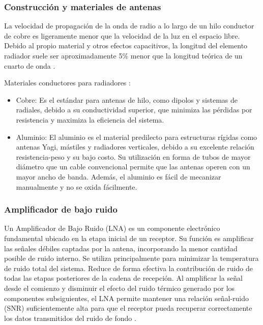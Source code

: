 \documentclass[12pt,a4paper]{article}
\begin{document}
\subsubsection{Construcción y materiales de antenas}\label{construcciuxf3n-y-materiales-antenas}

La velocidad de propagación de la onda de radio a lo largo de un hilo conductor de cobre es ligeramente menor que la velocidad de la luz en el espacio libre. Debido al propio material y otros efectos capacitivos, la longitud del elemento radiador suele ser aproximadamente 5\% menor que la longitud teórica de un cuarto de onda \cite{ref70}.

Materiales conductores para radiadores \cite{ref70}:

\begin{itemize}
\item
  Cobre: Es el estándar para antenas de hilo, como dipolos y sistemas de radiales, debido a su conductividad superior, que minimiza las pérdidas por resistencia y maximiza la eficiencia del sistema.
\item
  Aluminio: El aluminio es el material predilecto para estructuras rígidas como antenas Yagi, mástiles y radiadores verticales, debido a su excelente relación resistencia-peso y su bajo costo. Su utilización en forma de tubos de mayor diámetro que un cable convencional permite que las antenas operen con un mayor ancho de banda. Además, el aluminio es fácil de mecanizar manualmente y no se oxida fácilmente.
\end{itemize}

\subsubsection{Amplificador de bajo ruido}\label{amplificador-de-bajo-ruido}

Un Amplificador de Bajo Ruido (LNA) es un componente electrónico fundamental ubicado en la etapa inicial de un receptor. Su función es amplificar las señales débiles captadas por la antena, incorporando la menor cantidad posible de ruido interno. Se utiliza principalmente para minimizar la temperatura de ruido total del sistema. Reduce de forma efectiva la contribución de ruido de todas las etapas posteriores de la cadena de recepción. Al amplificar la señal desde el comienzo y disminuir el efecto del ruido térmico generado por los componentes subsiguientes, el LNA permite mantener una relación señal-ruido (SNR) suficientemente alta para que el receptor pueda recuperar correctamente los datos transmitidos del ruido de fondo \cite{ref40}.
\end{document}
